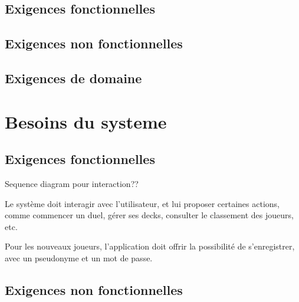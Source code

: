 \documentclass[11pt,a4paper]{article}
\begin{document}
\subsection{Exigences fonctionnelles}
\label{sec:exi-fonc}


\subsection{Exigences non fonctionnelles}
\label{sec:exi-nonfonc}



\subsection{Exigences de domaine}
\label{sec:exi-dom}

\section{Besoins du systeme}
\label{sec:besoins-sys}


\subsection{Exigences fonctionnelles}
\label{sec:exi-fonc-sys}


Sequence diagram pour interaction??

Le système doit interagir avec l'utilisateur, et lui proposer certaines actions, comme commencer un duel, gérer ses decks, consulter le classement des joueurs, etc.

Pour les nouveaux joueurs, l'application doit offrir la possibilité de s'enregistrer, avec un pseudonyme et un mot de passe.


\subsection{Exigences non fonctionnelles}
\label{sec:exi-nonfonc-sys}
\end{document}
